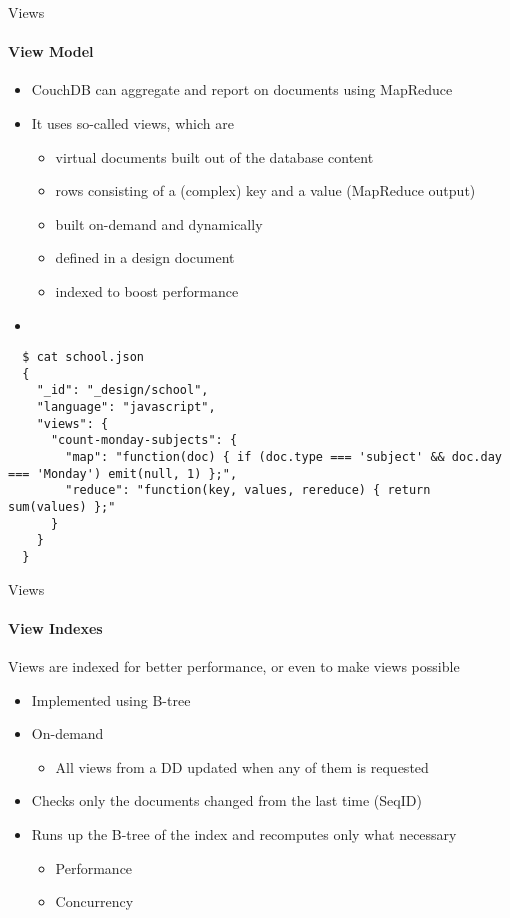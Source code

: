\documentclass{beamer}
\begin{document}
\begin{frame}[fragile]{Views}
  \framesubtitle{View Model}
  \begin{itemize}
    \item CouchDB can aggregate and report on documents using MapReduce
    \item It uses so-called views, which are 
    \begin{itemize}
      \item virtual documents built out of the database content
      \item rows consisting of a (complex) key and a value (MapReduce output)
      \item built on-demand and dynamically
      \item defined in a design document
      \item indexed to boost performance
    \end{itemize}
    \item
  \end{itemize}
  \fontsize{6}{8}\selectfont
  \begin{verbatim}
  $ cat school.json 
  {
    "_id": "_design/school",
    "language": "javascript",
    "views": {
      "count-monday-subjects": {
        "map": "function(doc) { if (doc.type === 'subject' && doc.day === 'Monday') emit(null, 1) };",
        "reduce": "function(key, values, rereduce) { return sum(values) };"
      }
    }
  }
  \end{verbatim}
\end{frame}

\begin{frame}{Views}
  \framesubtitle{View Indexes}
  Views are indexed for better performance, or even to make views possible
  \begin{itemize}
    \item Implemented using B-tree
    \item On-demand
    \begin{itemize}
      \item All views from a DD updated when any of them is requested
    \end{itemize}
    \item Checks only the documents changed from the last time (SeqID)
    \item Runs up the B-tree of the index and recomputes only what necessary
    \begin{itemize}
      \item Performance
      \item Concurrency
    \end{itemize}
  \end{itemize}
\end{frame}
\end{document}
